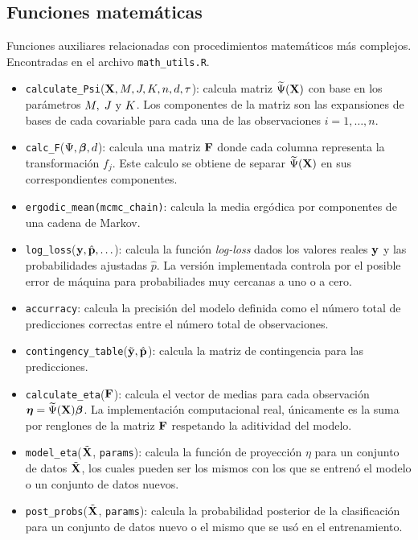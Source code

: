\documentclass[../../Main/Main.tex]{subfiles}
\begin{document}
\subsection*{Funciones matemáticas}
Funciones auxiliares relacionadas con procedimientos matemáticos más complejos. Encontradas en el archivo \verb|math_utils.R|.
\begin{itemize}[label = {}]
	\item \verb|calculate_Psi|($\mathbf{X},M,J,K,n,d,\tau$): calcula matriz $\widetilde{\Psi}(\mathbf{X})$ con base en los parámetros $M,\;J\text{ y }K$. Los componentes de la matriz son las expansiones de bases de cada covariable para cada una de las observaciones $i=1,\ldots,n$.
	\item \verb|calc_F|($\Psi, \bm{\beta}, d$): calcula una matriz $\bf{F}$ donde cada columna representa la transformación $f_j$. Este calculo se obtiene de separar $\widetilde{\Psi}(\mathbf{X})$ en sus correspondientes componentes.
	\item \verb|ergodic_mean(mcmc_chain)|: calcula la media ergódica por componentes de una cadena de Markov.
	\item \verb|log_loss|($\mathbf{y},\hat{\mathbf{p}},\ldots $): calcula la función \textit{log-loss} dados los valores reales $\mathbf{y}$ y las probabilidades ajustadas $\hat{p}$. La versión implementada controla por el posible error de máquina para probabiliades muy cercanas a uno o a cero.
	\item \verb|accurracy|: calcula la precisión del modelo definida como el número total de predicciones correctas entre el número total de observaciones.
	\item \verb|contingency_table|($\tilde{\mathbf{y}},\hat{\mathbf{p}}$): calcula la matriz de contingencia para las predicciones. 
	\item \verb|calculate_eta|($\bf{F}$): calcula el vector de medias para cada observación $\bm{\eta} = \widetilde{\Psi}(\mathbf{X})\bm{\beta}$. La implementación computacional real, únicamente es la suma por renglones de la matriz $\bf{F}$ respetando la aditividad del modelo.
	\item \verb|model_eta|($\tilde{\mathbf{X}}$, \verb|params|): calcula la función de proyección $\eta$ para un conjunto de datos $\tilde{\mathbf{X}}$, los cuales pueden ser los mismos con los que se entrenó el modelo o un conjunto de datos nuevos.
	\item \verb|post_probs|($\tilde{\mathbf{X}}$, \verb|params|): calcula la probabilidad posterior de la clasificación para un conjunto de datos nuevo o el mismo que se usó en el entrenamiento. 
\end{itemize}
\end{document}
